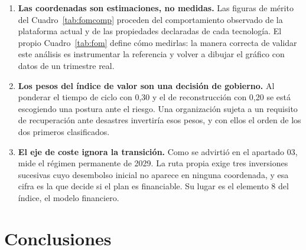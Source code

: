 \documentclass[11pt,letterpaper]{article}
\begin{document}
\begin{enumerate}
  \item \textbf{Las coordenadas son estimaciones, no medidas.} Las figuras de
    mérito del Cuadro~\ref{tab:fomcomp} proceden del comportamiento observado
    de la plataforma actual y de las propiedades declaradas de cada
    tecnología. El propio Cuadro~\ref{tab:fom} define cómo medirlas: la
    manera correcta de validar este análisis es instrumentar la referencia y
    volver a dibujar el gráfico con datos de un trimestre real.
  \item \textbf{Los pesos del índice de valor son una decisión de gobierno.}
    Al ponderar el tiempo de ciclo con 0,30 y el de reconstrucción con 0,20 se
    está escogiendo una postura ante el riesgo. Una organización sujeta a un
    requisito de recuperación ante desastres invertiría esos pesos, y con
    ellos el orden de los dos primeros clasificados.
  \item \textbf{El eje de coste ignora la transición.} Como se advirtió en el
    apartado 03, mide el régimen permanente de 2029. La ruta propia exige tres
    inversiones sucesivas cuyo desembolso inicial no aparece en ninguna
    coordenada, y esa cifra es la que decide si el plan es financiable. Su
    lugar es el elemento 8 del índice, el modelo financiero.
\end{enumerate}

\section{Conclusiones}
\label{sec:conclusiones}
\end{document}
